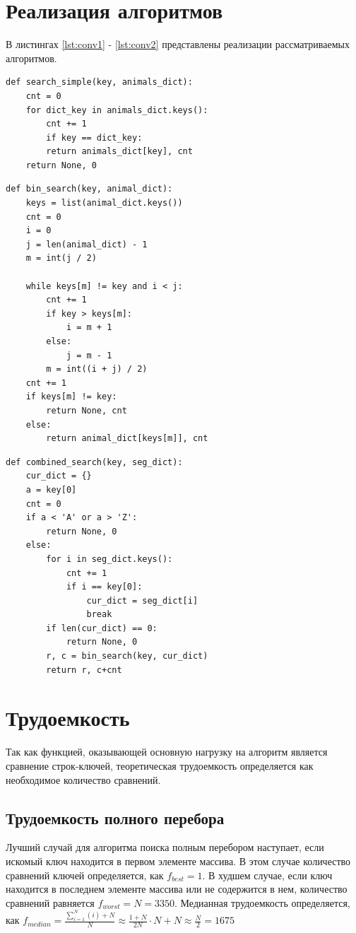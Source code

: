 \documentclass[a4paper,oneside,14pt]{extreport}
\begin{document}
\section{Реализация алгоритмов}
В листингах \ref{lst:conv1} - \ref{lst:conv2} представлены реализации рассматриваемых алгоритмов.
\captionsetup{singlelinecheck=false, justification=raggedright}
\begin{lstlisting}[label={lst:conv1},caption=Реализация алгоритма поиска полным перебором]
def search_simple(key, animals_dict):
	cnt = 0
	for dict_key in animals_dict.keys():
		cnt += 1
		if key == dict_key:
		return animals_dict[key], cnt
	return None, 0
\end{lstlisting}
\newpage
\begin{lstlisting}[caption=Реализация алгоритма бинарного поиска]
def bin_search(key, animal_dict):
	keys = list(animal_dict.keys())
	cnt = 0
	i = 0
	j = len(animal_dict) - 1
	m = int(j / 2)

	while keys[m] != key and i < j:
		cnt += 1
		if key > keys[m]:
			i = m + 1
		else:
			j = m - 1
		m = int((i + j) / 2)
	cnt += 1
	if keys[m] != key:
		return None, cnt
	else:
		return animal_dict[keys[m]], cnt
\end{lstlisting}
\begin{lstlisting}[label={lst:conv2},caption=Реализация алгоритма поиска по сегментам]
def combined_search(key, seg_dict):
	cur_dict = {}
	a = key[0]
	cnt = 0
	if a < 'A' or a > 'Z':
		return None, 0
	else:
		for i in seg_dict.keys():
			cnt += 1
			if i == key[0]:
				cur_dict = seg_dict[i]
				break
		if len(cur_dict) == 0:
			return None, 0
		r, c = bin_search(key, cur_dict)
		return r, c+cnt
\end{lstlisting}

\section{Трудоемкость}
Так как функцией, оказывающей основную нагрузку на алгоритм является сравнение строк-ключей, теоретическая трудоемкость определяется как необходимое количество сравнений.\par
\subsection{Трудоемкость полного перебора}
Лучший случай для алгоритма поиска полным перебором наступает, если искомый ключ находится в первом элементе массива. В этом случае количество сравнений ключей определяется, как $f_{best} = 1$. В худшем случае, если ключ находится в последнем элементе массива или не содержится в нем, количество сравнений равняется $f_{worst} = N = 3350$. Медианная трудоемкость определяется, как $f_{median} = \frac{\sum_{i = 1}^{N} (i) + N}{N} \approx \frac{1 + N}{2N} \cdot N + N \approx \frac{N}{2} = 1675$\par
\end{document}
